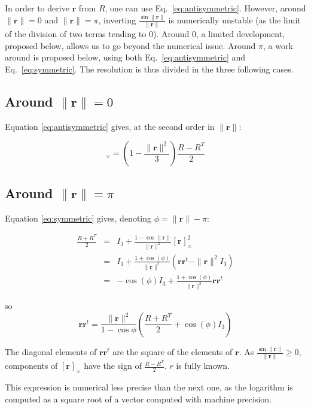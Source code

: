 \documentclass {article}
\newcommand\rot{\mathbf{r}}
\newcommand\rcross[1]{[\rot_{#1}]_{\times}}
\newcommand\normr{\|\rot\|}
\begin{document}
In order to derive $\rot$ from $R$, one can use Eq.\ \ref{eq:antisymmetric}.
However, around $\normr = 0$ and $\normr = \pi$, inverting $\frac{\sin\normr}{\normr}$ is numerically unstable (as the limit of the division of two terms tending to 0).
Around $0$, a limited development, proposed below, allows us to go beyond the numerical issue.
Around $\pi$, a work around is proposed below, using both Eq.\ \ref{eq:antisymmetric} and Eq.\ \ref{eq:symmetric}.
The resolution is thus divided in the three following cases.

\subsection{Around $\normr = 0$}

Equation \ref{eq:antisymmetric} gives, at the second order in $\normr$:

\begin{equation}
  \rcross{} = ( 1 - \frac{\normr^2}{3}) \frac{R - R^T}{2}
\end{equation}

\subsection{Around $\normr = \pi$}

Equation \ref{eq:symmetric} gives, denoting $\phi = \normr - \pi$:

\begin{eqnarray*}
\frac{R + R^T}{2} &=& I_3 + \frac{1 - \cos \normr}{\normr^2}\rcross{}^2 \\
                  &=& I_3 + \frac{1 + \cos \left( \phi \right) }{\normr^2} \left( \rot \rot^t - \normr^2 I_3 \right) \\
                  &=& - \cos (\phi) I_3 + \frac{1 + \cos \left( \phi \right) }{\normr^2} \rot \rot^t
\end{eqnarray*}

so
\begin{equation}
\rot \rot^t = \frac{\normr^2}{1 - \cos\phi} \left( \frac{R + R^T}{2} + \cos(\phi) I_3 \right)
\end{equation}

The diagonal elements of $\rot \rot^t$ are the square of the elements of $\rot$.
As $\frac{\sin \normr}{\normr} \geq 0 $, components of $\rcross{}$ have the sign of $\frac{R - R^T}{2}$.
$r$ is fully known.

This expression is numerical less precise than the next one, as the logarithm is computed as a square root of
a vector computed with machine precision.
\end{document}
